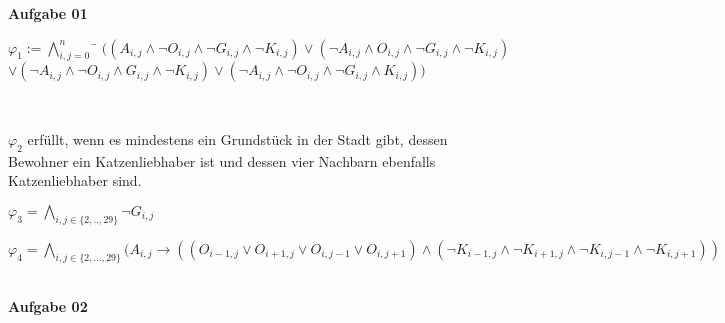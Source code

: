 \documentclass[a4paper,10pt]{article}
\begin{document}
	\parindent0pt
	\textbf{Aufgabe 01}
	\begin{compactenum} [(a)]
		\item  \begin{tabbing} $
			\varphi_1 := \bigwedge\limits_{i,j=0}^n $
			\= $ ((A_{i,j}\wedge \lnot O_{i,j} \wedge \lnot G_{i,j}\wedge \lnot K_{i,j})\vee(\lnot A_{i,j}\wedge O_{i,j}\wedge\lnot G_{i,j}\wedge \lnot K_{i,j}) $ \\
			\> $ \vee ( \lnot A_{i,j}\wedge \lnot O_{i,j}\wedge G_{i,j}\wedge \lnot K_{i,j})\vee( \lnot A_{i,j}\wedge \lnot O_{i,j}\wedge \lnot G_{i,j}\wedge K_{i,j}))$
		\end{tabbing}\
		\item $ \varphi_2 $ erfüllt, wenn es mindestens ein Grundstück in der Stadt gibt, dessen Bewohner ein Katzenliebhaber ist und dessen vier Nachbarn ebenfalls Katzenliebhaber sind.\\
		\item $ \varphi_3 = \bigwedge\limits_{i,j \in \{2,..,29\}} \lnot G_{i,j} $\\
		\item $ \varphi_4 = \bigwedge\limits_{i,j \in \{2,...,29\}} (A_{i,j} \rightarrow ((O_{i-1,j} \vee O_{i+1,j} \vee O_{i,j-1} \vee O_{i,j+1}) \wedge (\lnot K_{i-1,j} \wedge \lnot K_{i+1,j} \wedge \lnot K_{i,j-1} \wedge \lnot K_{i,j+1})) $
	\end{compactenum}\ \\
	\textbf{Aufgabe 02}
\end{document}
